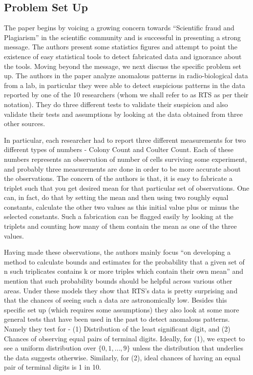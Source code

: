 \documentclass{article}
\begin{document}
\subsection{Problem Set Up}\label{problem-set-up}

The paper begins by voicing a growing concern towards ``Scientific fraud
and Plagiarism'' in the scientific community and is successful in
presenting a strong message. The authors present some statistics figures and attempt to point the existence of easy statistical tools to detect fabricated data and ignorance about the tools. Moving beyond the message, we next discuss the specific problem set up. The authors in the paper analyze anomalous patterns in radio-biological
data from a lab, in particular they were able to detect suspicious
patterns in the data reported by one of the 10 researchers (whom we
shall refer to as RTS as per their notation). They do three different
tests to validate their suspicion and also validate their tests and
assumptions by looking at the data obtained from three other sources.

In particular, each researcher had to report three different measurements for two
different types of numbers - Colony Count and Coulter Count. Each of
these numbers represents an observation of number of cells surviving some
experiment, and probably three measurements are done in order to be more
accurate about the observations. The concern of the authors is that, it is easy to fabricate a triplet such that you get desired mean for that particular set of observations. One can, in
fact, do that by setting the mean and then using two roughly equal
constants, calculate the other two values as this initial value plus or
minus the selected constants. Such a fabrication can be flagged easily
by looking at the triplets and counting how many of them contain the
mean as one of the three values.

Having made these observations, the
authors mainly focus ``on developing a method to calculate bounds and
estimates for the probability that a given set of n such triplicates
contains k or more triples which contain their own mean'' and mention
that such probability bounds should be helpful across various other
areas. Under these models they show that RTS's data is pretty surprising
and that the chances of seeing such a data are astronomically low.
Besides this specific set up (which requires some assumptions) they also
look at some more general tests that have been used in the past to
detect anomalous patterns. Namely they test for - (1) Distribution of
the least significant digit, and (2) Chances of observing equal pairs of
terminal digits. Ideally, for (1), we expect to see a uniform
distribution over \(\{0, 1, \ldots, 9\}\) unless the distribution that
underlies the data suggests otherwise. Similarly, for (2), ideal chances
of having an equal pair of terminal digits is 1 in 10.
\end{document}
